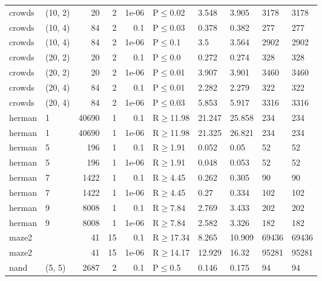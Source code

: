 \begin{longtable}{llrrrlllll}
 crowds        & (10, 2)   &     	20 &   2 & 1e-06 & P$\leq$0.02  & 3.548   & 3.905   & 3178   & 3178   \\
 crowds        & (10, 4)   &     	84 &   2 & 0.1   & P$\leq$0.03  & 0.378   & 0.382   & 277    & 277    \\
 crowds        & (10, 4)   &     	84 &   2 & 1e-06 & P$\leq$0.1   & 3.5     & 3.564   & 2902   & 2902   \\
 crowds        & (20, 2)   &     	20 &   2 & 0.1   & P$\leq$0.0   & 0.272   & 0.274   & 328    & 328    \\
 crowds        & (20, 2)   &     	20 &   2 & 1e-06 & P$\leq$0.01  & 3.907   & 3.901   & 3460   & 3460   \\
 crowds        & (20, 4)   &     	84 &   2 & 0.1   & P$\leq$0.01  & 2.282   & 2.279   & 322    & 322    \\
 crowds        & (20, 4)   &     	84 &   2 & 1e-06 & P$\leq$0.03  & 5.853   & 5.917   & 3316   & 3316   \\
 herman        & 1         &  	40690 &   1 & 0.1   & R$\geq$11.98 & 21.247  & 25.858  & 234    & 234    \\
 herman        & 1         &  	40690 &   1 & 1e-06 & R$\geq$11.98 & 21.325  & 26.821  & 234    & 234    \\
 herman        & 5         &    	196 &   1 & 0.1   & R$\geq$1.91  & 0.052   & 0.05    & 52     & 52     \\
 herman        & 5         &    	196 &   1 & 1e-06 & R$\geq$1.91  & 0.048   & 0.053   & 52     & 52     \\
 herman        & 7         &   	1422 &   1 & 0.1   & R$\geq$4.45  & 0.262   & 0.305   & 90     & 90     \\
 herman        & 7         &   	1422 &   1 & 1e-06 & R$\geq$4.45  & 0.27    & 0.334   & 102    & 102    \\
 herman        & 9         &   	8008 &   1 & 0.1   & R$\geq$7.84  & 2.769   & 3.433   & 202    & 202    \\
 herman        & 9         &   	8008 &   1 & 1e-06 & R$\geq$7.84  & 2.582   & 3.326   & 182    & 182    \\
 maze2         &           &     	41 &  15 & 0.1   & R$\geq$17.34 & 8.265   & 10.909  & 69436  & 69436  \\
 maze2         &           &     	41 &  15 & 1e-06 & R$\geq$14.17 & 12.929  & 16.32   & 95281  & 95281  \\
 nand          & (5, 5)    &   	2687 &   2 & 0.1   & P$\leq$0.5   & 0.146   & 0.175   & 94     & 94     \\

\end{longtable}
